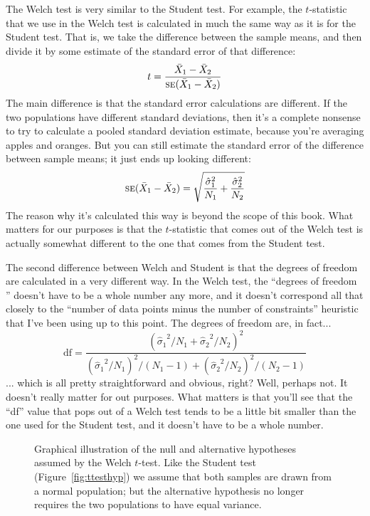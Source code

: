 The Welch test is very similar to the Student test. For example, the $t$-statistic that we use in the Welch test is calculated in much the same way as it is for the Student test. That is, we take the difference between the sample means, and then divide it by some estimate of the standard error of that difference:
$$
t = \frac{\bar{X}_1 - \bar{X}_2}{\mbox{\textsc{se}}(\bar{X}_1 - \bar{X}_2)}
$$
The main difference is that the standard error calculations are different. If the two populations have different standard deviations, then it's a complete nonsense to try to calculate a pooled standard deviation estimate, because you're averaging apples and oranges. But you can still estimate the standard error of the difference between sample means; it just ends up looking different:
$$
\mbox{\textsc{se}}(\bar{X}_1 - \bar{X}_2) = \sqrt{ \frac{{\hat{\sigma}_1}^2}{N_1} + \frac{{\hat{\sigma}_2}^2}{N_2} }
$$
The reason why it's calculated this way is beyond the scope of this book. What matters for our purposes is that the $t$-statistic that comes out of the Welch test is actually somewhat different to the one that comes from the Student test. 

The second difference between Welch and Student is that the degrees of freedom are calculated in a very different way. In the Welch test, the ``degrees of freedom '' doesn't have to be a whole number any more, and it doesn't correspond all that closely to the ``number of data points minus the number of constraints'' heuristic that I've been using up to this point. The degrees of freedom are, in fact...
$$
\mbox{df} = \frac{ ({\hat{\sigma}_1}^2 / N_1 + {\hat{\sigma}_2}^2 / N_2)^2 }{  ({\hat{\sigma}_1}^2 / N_1)^2 / (N_1 -1 )  + ({\hat{\sigma}_2}^2 / N_2)^2 / (N_2 -1 ) } 
$$
... which is all pretty straightforward and obvious, right? Well, perhaps not. It doesn't really matter for out purposes. What matters is that you'll see that the ``df'' value that pops out of a Welch test tends to be a little bit smaller than the one used for the Student test, and it doesn't have to be a whole number. 


\begin{figure}
\begin{center}
\caption{Graphical illustration of the null and alternative hypotheses assumed by the Welch $t$-test. Like the Student test (Figure~\ref{fig:ttesthyp}) we assume that both samples are drawn from a normal population; but the alternative hypothesis no longer requires the two populations to have equal variance.}
\HR
\label{fig:ttesthyp2}
\end{center}
\end{figure}


